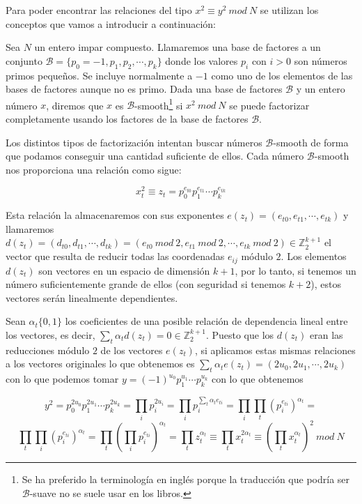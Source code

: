 Para poder encontrar las relaciones del tipo $x^2 \equiv y^2 ~mod~N$ se utilizan
los conceptos que vamos a introducir a continuaci\'on:

\begin{definition}
Sea $N$ un entero impar compuesto. Llamaremos una base de factores a un conjunto
${\mathcal B} = \{ p_0 = -1, p_1, p_2, \cdots, p_k \}$ donde los valores $p_i$ con $i>0$ son
n\'umeros primos peque\~nos. Se incluye normalmente a $-1$ como uno de los
elementos de las bases de factores aunque no es primo.
Dada una base de factores ${\mathcal B}$ y un entero n\'umero $x$, diremos
que $x$ es ${\mathcal B}$-smooth\footnote{Se ha preferido la terminolog\'ia en
ingl\'es porque la traducci\'on que podr\'ia ser ${\mathcal B}$-suave no se
suele usar en los libros.} si $x^2~mod~N$ se puede factorizar
completamente usando los factores de la base de factores ${\mathcal B}$.
\end{definition}

Los distintos tipos de factorizaci\'on intentan buscar n\'umeros ${\mathcal B}$-smooth
de forma que podamos conseguir una cantidad suficiente de ellos. Cada n\'umero ${\mathcal B}$-smooth nos
proporciona una relaci\'on como sigue:

\[ x_t^2 \equiv z_t = p_0^{e_{t0}} p_1^{e_{t1}} \cdots p_k^{e_{tk}} \]

Esta relaci\'on la almacenaremos con sus exponentes $e(z_t) = (e_{t0},e_{t1},\cdots,e_{tk})$ y llamaremos
$d(z_t) = (d_{t0},d_{t1},\cdots,d_{tk}) = (e_{t0}~mod~2,e_{t1}~mod~2,\cdots,e_{tk}~mod~2) \in
{\mathbb Z}_2^{k+1}$ el vector que resulta de reducir todas las coordenadas $e_{ij}$ m\'odulo $2$.
Los elementos $d(z_t)$ son vectores en un espacio de dimensi\'on $k+1$, por lo tanto,
si tenemos un n\'umero suficientemente grande de ellos (con seguridad si tenemos $k+2$), estos
vectores ser\'an linealmente dependientes.

Sean $\alpha_t \{0,1\}$ los coeficientes de una posible relaci\'on de dependencia lineal entre los
vectores, es decir, $\sum_{t} \alpha_t d(z_t) = 0 \in {\mathbb Z}_2^{k+1}$. Puesto que los $d(z_t)$ eran las reducciones m\'odulo $2$ de los vectores $e(z_t)$, si
aplicamos estas mismas relaciones a los vectores originales lo que obtenemos es $\sum_t \alpha_t e(z_t) = (2u_0, 2u_1, \cdots, 2u_k)$ con lo que podemos
tomar $y= (-1)^{u_0} p_1 ^ {u_1} \cdots p_k^{u_k}$ con lo que obtenemos

\[
y^2 =  p_0^{2u_0} p_1 ^ {2u_1} \cdots p_k^{2u_k} = \prod_{i} p_i^{2u_i} = \prod_i p_i^{\sum_t \alpha_t e_{ti}} =
\prod_i \prod_t \left(p_i^{e_{ti}}\right)^{\alpha_t} = \] \[\prod_t \prod_i \left(p_i^{e_{ti}}\right)^{\alpha_t} = \prod_t \left(\prod_i p_i^{e_{ti}}\right)^{\alpha_t} = \prod_t z_t^{\alpha_t} \equiv
\prod_t x_t^{2\alpha_t} \equiv \left( \prod_t x_t^{\alpha_t}\right)^2~mod~N
\]

